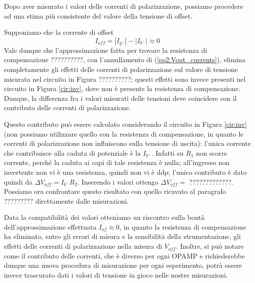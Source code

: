 Dopo aver misurato i valori delle correnti di polarizzazione, possiamo procedere ad una stima più consistente del valore della tensione di offset.

Supponiamo che la corrente di offset
$$I_{off} = |I_{b^+}|-|I_{b^-}| \approx 0$$
Vale dunque che l'approssimazione fatta per trovare la resistenza di compensazione ??????????, con l'annullamento di (\ref{eq2:Vout_currents}), elimina completamente gli effetti delle correnti di polarizzazione sul valore di tensione misurata nel circuito in Figura ??????????; questi effetti sono invece presenti nel circuito in Figura \ref{cir:inv}, dove non è presente la resistenza di compensazione. Dunque, la differenza fra i valori misurati delle tensioni deve coincidere con il contributo delle correnti di polarizzazione.

Questo contributo può essere calcolato considerando il circuito in Figura \ref{cir:inv} (non possiamo utilizzare quello con la resistenza di compensazione, in quanto le correnti di polarizzazione non influiscono sulla tensione di uscita): l'unica corrente che contribuisce alla caduta di potenziale è la $I_{b^-}$. Infatti su $R_1$ non scorre corrente, perché la caduta ai capi di tale resistenza è nulla; all'ingresso non invertente non vi è una resistenza, quindi non vi è ddp; l'unico contributo è dato quindi da $\Delta V_{off} = I_{b^-} R_2$. Inserendo i valori ottengo $\Delta V_{off} = $ ?????????????. Possiamo ora confrontare questo risultato con quello ricavato al paragrafo ????????? direttamente dalle misurazioni.

Data la compatibilità dei valori otteniamo un riscontro sulla bontà dell'approssimazione effettuata $I_{of} \approx 0$, in quanto la resistenza di compensazione ha eliminato, entro gli errori di misura e la sensibilità della strumentazione, gli effetti delle correnti di polarizzazione nella misura di $V_{off}$. Inoltre, si può notare come il contributo delle correnti, che è diverso per ogni OPAMP e richiederebbe dunque una nuova procedura di misurazione per ogni esperimento, potrà essere invece trascurato dati i valori di tensione in gioco nelle nostre misurazioni.